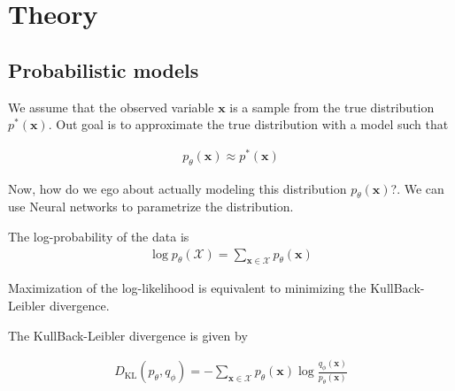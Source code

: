 \chapter{Theory}

%
%


\section{Probabilistic models}
We assume that the observed variable $\mathbf{x}$ is a sample from the true distribution $p^*(\mathbf{x})$.\cite{vaeintro} Out goal is to approximate the true distribution with a model such that

\begin{align}
  p_\theta(\mathbf{x})\approx p^*(\mathbf{x})
\end{align}

Now, how do we ego about actually modeling this distribution $p_\theta(\mathbf{x})$?. We can use Neural networks to parametrize the distribution.

The log-probability of the data is
\begin{align}
  \log p_\theta(\mathcal{X}) = \sum_{\mathbf{x}\in\mathcal{X}} p_\theta(\mathbf{x})
\end{align}

Maximization of the log-likelihood is equivalent to minimizing the KullBack-Leibler divergence.

The KullBack-Leibler divergence is given by

\begin{align}
D_{\text{KL}}(p_\theta,q_\phi) = -\sum_{\mathbf{x}\in\mathcal{X}}p_\theta(\mathbf{x})\log \frac{q_\phi(\mathbf{x})}{p_\theta(\mathbf{x})}
\end{align}


